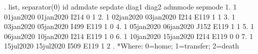 . list, separator(0)
{\smallskip}
     {\TLC}
     {\VBAR} id     admdate     sepdate   diag1   diag2   admmode   sepmode {\VBAR}
     {\LFTT}
  1. {\VBAR}  1   01jan2020   01jan2020    I214                 0         1 {\VBAR}
  2. {\VBAR}  1   02jan2020   03jan2020    I214    E119         1         1 {\VBAR}
  3. {\VBAR}  1   03jan2020   05jan2020    I499    E119         1         0 {\VBAR}
  4. {\VBAR}  1   05jan2020   06jan2020    J152    E119         1         1 {\VBAR}
  5. {\VBAR}  1   06jan2020   10jan2020    I214    E119         1         0 {\VBAR}
  6. {\VBAR}  1   10jan2020   15jan2020    I214    E119         0         0 {\VBAR}
  7. {\VBAR}  1   15jul2020   15jul2020    I509    E119         1         2 {\VBAR}
     {\BLC}
{\smallskip}
. *Where: 0=home; 1=transfer; 2=death
